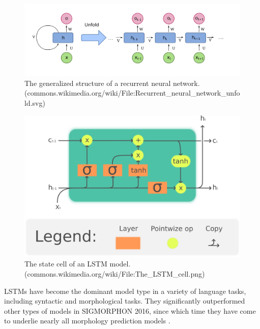 \begin{figure}[t]
\includegraphics[width=12cm]{images/RNN.png}
\centering
\caption{The generalized structure of a recurrent neural network. (commons.wikimedia.org/wiki/File:Recurrent\_neural\_network\_unfold.svg)}
\end{figure}

\begin{figure}[t]
\includegraphics[width=12cm]{images/The_LSTM_cell.png}
\centering
\caption{The state cell of an LSTM model. (commons.wikimedia.org/wiki/File:The\_LSTM\_cell.png)}
\end{figure}

LSTMs have become the dominant model type in a variety of language tasks, including syntactic and morphological tasks. They significantly outperformed other types of models in SIGMORPHON 2016, since which time they have come to underlie nearly all morphology prediction models \parencite{Cotterell2016} \parencite{Cotterell2017}.



